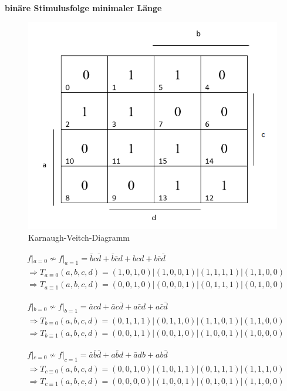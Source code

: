 \documentclass[fleqn]{article}
\begin{document}
\textbf{binäre Stimulusfolge minimaler Länge}

\begin{figure}[htbp]
    \centering\includegraphics[width=5in]{bild2.png}
    \caption{Karnaugh-Veitch-Diagramm}
\end{figure}

\begin{equation}
    \begin{aligned}
&f|_{a=0} \nsim f|_{a=1} = \bar{b}c\bar{d}+\bar{b}\bar{c}d+bcd+b\bar{c}\bar{d}\\
&\Rightarrow T_{a\equiv 0}(a,b,c,d) = (1,0,1,0)|(1,0,0,1)|(1,1,1,1)|(1,1,0,0)\\
&\Rightarrow T_{a\equiv 1}(a,b,c,d) = (0,0,1,0)|(0,0,0,1)|(0,1,1,1)|(0,1,0,0)
    \end{aligned}
\end{equation}

\begin{equation}
    \begin{aligned}
&f|_{b=0} \nsim f|_{b=1} = \bar{a}cd+\bar{a}c\bar{d}+a\bar{c}d+a\bar{c}\bar{d}\\
&\Rightarrow T_{b\equiv 0}(a,b,c,d) = (0,1,1,1)|(0,1,1,0)|(1,1,0,1)|(1,1,0,0)\\
&\Rightarrow T_{b\equiv 1}(a,b,c,d) = (0,0,1,1)|(0,0,1,0)|(1,0,0,1)|(1,0,0,0)
    \end{aligned}
\end{equation}

\begin{equation}
    \begin{aligned}
&f|_{c=0} \nsim f|_{c=1} = \bar{a}\bar{b}\bar{d}+a\bar{b}d+\bar{a}db+ab\bar{d}\\
&\Rightarrow T_{c\equiv 0}(a,b,c,d) = (0,0,1,0)|(1,0,1,1)|(0,1,1,1)|(1,1,1,0)\\
&\Rightarrow T_{c\equiv 1}(a,b,c,d) = (0,0,0,0)|(1,0,0,1)|(0,1,0,1)|(1,1,0,0)
    \end{aligned}
\end{equation}
\end{document}
